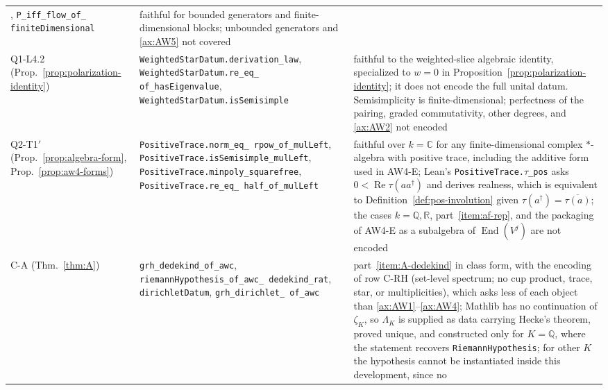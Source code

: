 \documentclass[11pt]{amsart}
\theoremstyle{plain}
\theoremstyle{definition}
\theoremstyle{remark}
\numberwithin{equation}{section}
\newcommand{\C}{\mathbb{C}}
\newcommand{\R}{\mathbb{R}}
\newcommand{\Q}{\mathbb{Q}}
\DeclareMathOperator{\Rea}{Re}
\renewcommand{\Re}{\Rea}
\begin{document}
{\begin{longtable}{@{}>{\raggedright\arraybackslash}p{}
>{\raggedright\arraybackslash}p{}
>{\raggedright\arraybackslash}p{}@{}}
{flow},
\texttt{P\_\allowbreak{}iff\_\allowbreak{}flow\_\allowbreak{}of\_\allowbreak{}%
finiteDimensional} &
faithful for bounded generators and finite-dimensional blocks;
unbounded generators and \ref{ax:AW5} not covered\\
Q1-L4.2 (Prop.~\ref{prop:polarization-identity}) &
\texttt{WeightedStarDatum.\allowbreak{}derivation\_\allowbreak{}law},
\texttt{WeightedStarDatum.\allowbreak{}re\_\allowbreak{}eq\_\allowbreak{}%
of\_\allowbreak{}hasEigenvalue},
\texttt{WeightedStarDatum.\allowbreak{}isSemisimple} &
faithful to the weighted-slice algebraic identity, specialized to
$w=0$ in Proposition~\ref{prop:polarization-identity}; it does not
encode the full unital datum. Semisimplicity is finite-dimensional;
perfectness of
the pairing, graded commutativity, other
degrees, and \ref{ax:AW2} not encoded\\
Q2-T1$'$ (Prop.~\ref{prop:algebra-form}, Prop.~\ref{prop:aw4-forms}) &
\texttt{PositiveTrace.\allowbreak{}norm\_\allowbreak{}eq\_\allowbreak{}%
rpow\_\allowbreak{}of\_\allowbreak{}mulLeft},
\texttt{PositiveTrace.\allowbreak{}isSemisimple\_\allowbreak{}mulLeft},
\texttt{PositiveTrace.\allowbreak{}minpoly\_\allowbreak{}squarefree},
\texttt{PositiveTrace.\allowbreak{}re\_\allowbreak{}eq\_\allowbreak{}%
half\_\allowbreak{}of\_\allowbreak{}mulLeft} &
faithful over $k=\C$ for any finite-dimensional complex $*$-algebra
with positive trace, including the additive form used in AW4-E; Lean's
\texttt{PositiveTrace.}$\tau$\texttt{\_pos} asks $0<\Re\tau(aa^\dagger)$
and derives realness, which is equivalent to
Definition~\ref{def:pos-involution} given
$\tau(a^\dagger)=\overline{\tau(a)}$; the cases $k=\Q,\R$,
part~\ref{item:af-rep}, and the packaging of AW4-E as a subalgebra of
$\operatorname{End}(V^j)$ are not encoded\\
C-A (Thm.~\ref{thm:A}) &
\texttt{grh\_\allowbreak{}dedekind\_\allowbreak{}of\_\allowbreak{}awc},
\texttt{riemannHypothesis\_\allowbreak{}of\_\allowbreak{}awc\_\allowbreak{}%
dedekind\_\allowbreak{}rat},
\texttt{dirichletDatum}, \texttt{grh\_\allowbreak{}dirichlet\_\allowbreak{}%
of\_\allowbreak{}awc} &
part~\ref{item:A-dedekind} in class form, with the encoding of row
C-RH (set-level spectrum; no cup product, trace, star, or
multiplicities), which asks less of each object than
\ref{ax:AW1}--\ref{ax:AW4}; Mathlib has no continuation
of $\zeta_K$, so $\Lambda_K$ is supplied as data carrying Hecke's
theorem, proved unique, and constructed only for $K=\Q$, where the
statement recovers \texttt{RiemannHypothesis}; for other $K$ the
hypothesis cannot be instantiated inside this development, since no

\end{longtable}}
\end{document}
